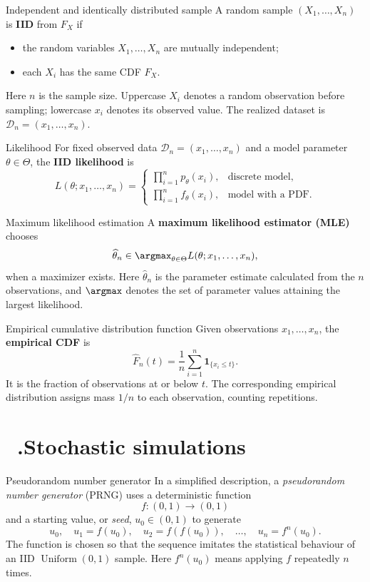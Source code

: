 \documentclass[12pt,a4paper,oneside]{report}
\newcommand{\notesheading}[1]{%
  \refstepcounter{chapter}%
  \section*{\chaptername~\thechapter.\enspace #1}}
\begin{document}
\begin{frameddefn}{Independent and identically distributed sample}
A random sample $(X_1,\ldots,X_n)$ is \textbf{IID} from $F_X$ if
\begin{itemize}
  \item the random variables $X_1,\ldots,X_n$ are mutually
    independent;
  \item each $X_i$ has the same CDF $F_X$.
\end{itemize}
Here $n$ is the sample size. Uppercase $X_i$ denotes a random
observation before sampling; lowercase $x_i$ denotes its observed
value. The realized dataset is $\mathcal D_n=(x_1,\ldots,x_n)$.
\end{frameddefn}

\begin{frameddefn}{Likelihood}
\label{def:likelihood}
For fixed observed data $\mathcal D_n=(x_1,\ldots,x_n)$ and
a model parameter $\theta\in\Theta$, the \textbf{IID likelihood} is
\[
  L(\theta;x_1,\ldots,x_n)=
  \begin{cases}
    \displaystyle\prod_{i=1}^n p_\theta(x_i),
       & \text{discrete model},\\[6pt]
    \displaystyle\prod_{i=1}^n f_\theta(x_i),
       & \text{model with a PDF}.
  \end{cases}
\]
\end{frameddefn}

\begin{frameddefn}{Maximum likelihood estimation}
\label{def:maximum-likelihood}
A \textbf{maximum likelihood estimator (MLE)} chooses
\[
  \widehat\theta_n\in
  \argmax_{\theta\in\Theta}L(\theta;x_1,\ldots,x_n),
\]
when a maximizer exists. Here $\widehat\theta_n$ is the parameter
estimate calculated from the $n$ observations, and $\argmax$
denotes the set of parameter values attaining the largest
likelihood.
\end{frameddefn}

\begin{frameddefn}{Empirical cumulative distribution function}
Given observations $x_1,\ldots,x_n$, the \textbf{empirical CDF}
is
\[
  \widehat F_n(t)=\frac1n\sum_{i=1}^n
    \mathbf 1_{\{x_i\leq t\}}.
\]
It is the fraction of observations at or below $t$.
The corresponding empirical distribution assigns mass $1/n$
to each observation, counting repetitions.
\end{frameddefn}

\notesheading{Stochastic simulations}

\begin{frameddefn}{Pseudorandom number generator}
\label{def:prng}
In a simplified description, a \emph{pseudorandom number generator}
(PRNG) uses a deterministic function
\[
  f:(0,1)\longrightarrow(0,1)
\]
and a starting value, or \emph{seed}, $u_0\in(0,1)$ to generate
\[
  u_0,\quad u_1=f(u_0),\quad u_2=f(f(u_0)),\quad
  \ldots,\quad u_n=f^n(u_0).
\]
The function is chosen so that the sequence imitates the statistical
behaviour of an IID $\operatorname{Uniform}(0,1)$ sample.
Here $f^n(u_0)$ means applying $f$ repeatedly $n$ times.
\end{frameddefn}
\end{document}

